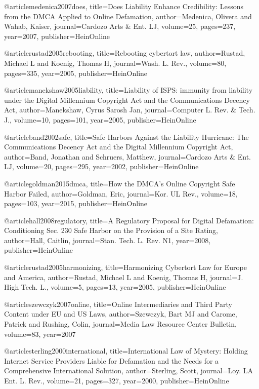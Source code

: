 @article{medenica2007does,
  title={Does Liability Enhance Credibility: Lessons from the DMCA Applied to Online Defamation},
  author={Medenica, Olivera and Wahab, Kaiser},
  journal={Cardozo Arts \& Ent. LJ},
  volume={25},
  pages={237},
  year={2007},
  publisher={HeinOnline}
}

@article{rustad2005rebooting,
  title={Rebooting cybertort law},
  author={Rustad, Michael L and Koenig, Thomas H},
  journal={Wash. L. Rev.},
  volume={80},
  pages={335},
  year={2005},
  publisher={HeinOnline}
}

@article{manekshaw2005liability,
  title={Liability of ISPS: immunity from liability under the Digital Millennium Copyright Act and the Communications Decency Act},
  author={Manekshaw, Cyrus Sarosh Jan},
  journal={Computer L. Rev. \& Tech. J.},
  volume={10},
  pages={101},
  year={2005},
  publisher={HeinOnline}
}

@article{band2002safe,
  title={Safe Harbors Against the Liability Hurricane: The Communications Decency Act and the Digital Millennium Copyright Act},
  author={Band, Jonathan and Schruers, Matthew},
  journal={Cardozo Arts \& Ent. LJ},
  volume={20},
  pages={295},
  year={2002},
  publisher={HeinOnline}
}

@article{goldman2015dmca,
  title={How the DMCA's Online Copyright Safe Harbor Failed},
  author={Goldman, Eric},
  journal={Kor. UL Rev.},
  volume={18},
  pages={103},
  year={2015},
  publisher={HeinOnline}
}

@article{hall2008regulatory,
  title={A Regulatory Proposal for Digital Defamation: Conditioning Sec. 230 Safe Harbor on the Provision of a Site Rating},
  author={Hall, Caitlin},
  journal={Stan. Tech. L. Rev. N1},
  year={2008},
  publisher={HeinOnline}
}


@article{rustad2005harmonizing,
  title={Harmonizing Cybertort Law for Europe and America},
  author={Rustad, Michael L and Koenig, Thomas H},
  journal={J. High Tech. L.},
  volume={5},
  pages={13},
  year={2005},
  publisher={HeinOnline}
}

@article{szewczyk2007online,
  title={Online Intermediaries and Third Party Content under EU and US Laws},
  author={Szewczyk, Bart MJ and Carome, Patrick and Rushing, Colin},
  journal={Media Law Resource Center Bulletin},
  volume={83},
  year={2007}
}

@article{sterling2000international,
  title={International Law of Mystery: Holding Internet Service Providers Liable for Defamation and the Needs for a Comprehensive International Solution},
  author={Sterling, Scott},
  journal={Loy. LA Ent. L. Rev.},
  volume={21},
  pages={327},
  year={2000},
  publisher={HeinOnline}
}

